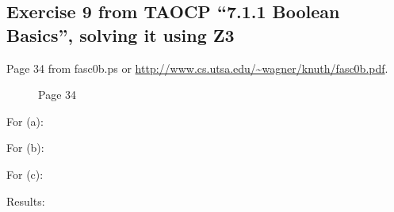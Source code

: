 \subsection{Exercise 9 from TAOCP ``7.1.1 Boolean Basics'', solving it using Z3}

Page 34 from fasc0b.ps or \url{http://www.cs.utsa.edu/~wagner/knuth/fasc0b.pdf}.

\begin{figure}[H]
\centering
{}
\caption{Page 34}
\end{figure}

For (a):



For (b):



For (c):



Results:



